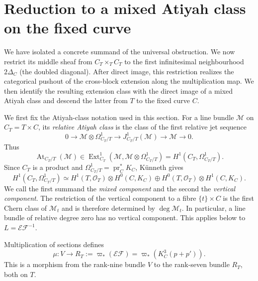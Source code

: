 \documentclass[11pt,a4paper,dvipsnames]{amsart}
\numberwithin{equation}{section}
\theoremstyle{plain}
\theoremstyle{definition}
\newcommand{\cO}{\mathcal O}
\newcommand{\cE}{\mathcal E}
\newcommand{\cF}{\mathcal F}
\newcommand{\At}{\operatorname{At}}
\begin{document}
\section{Reduction to a mixed Atiyah class on the fixed curve}\label{Atiyah}


 We have isolated a concrete summand of the universal obstruction.  We now
restrict its middle sheaf from $C_T\times_T C_T$ to the first
infinitesimal neighbourhood $2\Delta_C$ (the doubled diagonal).  After direct image, this restriction realizes
the categorical pushout of the cross-block extension along the multiplication
map.  We then identify the resulting extension class with the direct image of
a mixed Atiyah class and descend the latter from $T$ to the fixed curve $C$.

We first fix the Atiyah-class notation used in this section.  For a line
bundle $\mathscr M$ on $C_T=T\times C$, its \emph{relative Atiyah class}
is the class of the first relative jet sequence
\begin{equation}\label{eq:relative-jet-sequence}
0\longrightarrow
 \mathscr M\otimes\Omega^1_{C_T/T}
\longrightarrow J^1_{C_T/T}(\mathscr M)
\longrightarrow\mathscr M\longrightarrow0.
\end{equation}
Thus
\begin{equation}\label{eq:relative-At-target}
 \At_{{C_T}/T}(\mathscr M)
 \in\operatorname{Ext}^1_{C_T}
   (\mathscr M,\mathscr M\otimes\Omega^1_{C_T/T})
 =H^1(C_T,\Omega^1_{C_T/T}).
\end{equation}
Since $C_T$ is a product and
$\Omega^1_{C_T/T}=\operatorname{pr}_C^*K_C$, K\"unneth gives
\begin{equation}\label{eq:At-Kunneth-T}
 H^1(C_T,\Omega^1_{C_T/T})
 \simeq
 H^1(T,\cO_T)\otimes H^0(C,K_C)
 \oplus
 H^0(T,\cO_T)\otimes H^1(C,K_C).
\end{equation}
We call the first summand the \emph{mixed component} and the second the
\emph{vertical component}.  The restriction of the vertical component to
a fibre $\{t\}\times C$ is the first Chern class of $\mathscr M_t$ and is
therefore determined by $\deg\mathscr M_t$.  In particular, a line bundle
of relative degree zero has no vertical component.  This applies below to
$L=\cE\cF^{-1}$.


Multiplication of sections defines
\begin{equation}\label{eq:mu}
 \mu:V\longrightarrow
 R_T:=\varpi_*(\cE\cF)=\varpi_*(K_C^3(p+p')).
\end{equation}
This is a morphism from the rank-nine bundle $V$ to the rank-seven bundle
$R_T$, both on $T$.
\end{document}
